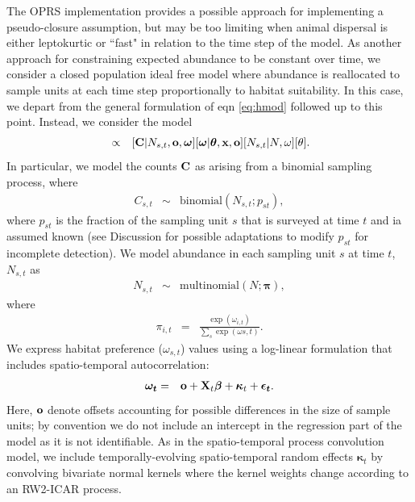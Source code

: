 \documentclass[times,mee,doublespace,]{besauth2}
\begin{document}
The OPRS implementation provides a possible approach for implementing a pseudo-closure assumption, but may be too limiting when animal dispersal is either leptokurtic or ``fast" in relation to the time step of the model.  As another approach for constraining expected abundance to be constant over time, we consider a closed population
ideal free model where abundance is reallocated to sample units at each time step proportionally to habitat suitability.  In this case, we depart from the general formulation of eqn \ref{eq:hmod} followed up to this point.  Instead, we consider the model
\begin{eqnarray}
  [N, N_{s,t}, \boldsymbol{\omega},\boldsymbol{\theta} | {\bf x},{\bf C},{\bf o},{\bf p}] & \propto & [{\bf C} | N_{s,t}, {\bf o}, \boldsymbol{\omega}] [\boldsymbol{\omega} | \boldsymbol{\theta},{\bf x},{\bf o}] [N_{s,t}|N,\omega] [\theta].
  \label{eq:cpif-post}
\end{eqnarray}
In particular, we model the counts ${\bf C}$ as arising from a binomial sampling process, where
\begin{eqnarray*}
  C_{s,t} & \sim & \textrm{binomial}(N_{s,t}; p_{st}),
\end{eqnarray*}
where $p_{st}$ is the fraction of the sampling unit $s$ that is surveyed at time $t$ and ia assumed known (see Discussion for possible adaptations to modify $p_{st}$ for incomplete detection).
We model abundance in each sampling unit $s$ at time $t$, $N_{s,t}$ as
\begin{eqnarray*}
  N_{s,t} & \sim & \textrm{multinomial}(N; \boldsymbol{\pi}),
\end{eqnarray*}
where
\begin{eqnarray*}
  \pi_{i,t} & = & \frac{\exp(\omega_{i,t})}{\sum_s \exp(\omega{s,t})}.
\end{eqnarray*}
We express habitat preference ($\omega_{s,t}$) values using a log-linear formulation that includes spatio-temporal autocorrelation:
\begin{eqnarray*}
  \boldsymbol{\omega_t} & = & {\bf o} + {\bf X}_t \boldsymbol{\beta} + \boldsymbol{\kappa}_t + \boldsymbol{\epsilon_t}.
\end{eqnarray*}
Here, ${\bf o}$ denote offsets accounting for possible differences in the size of sample units; by convention we do not include an intercept in the regression part of the model as it is not identifiable.
As in the spatio-temporal process convolution model, we include temporally-evolving spatio-temporal random effects $\boldsymbol{\kappa}_t$ by convolving bivariate normal kernels where the kernel weights change according to an RW2-ICAR process.
\end{document}
